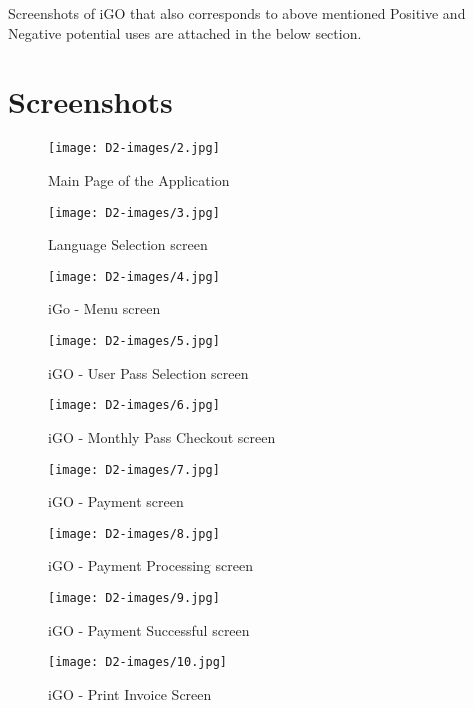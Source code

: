 \documentclass[a4paper,12pt]{report}
\newcommand{\asection}[2]{
\setcounter{section}{#1}
\addtocounter{section}{-1}
\section{#2}
}
\begin{document}
Screenshots of iGO that also corresponds to above mentioned Positive and Negative potential uses are attached in the below section.
\newpage
\asection{2}{Screenshots}
\begin{figure}[h!]
  \centering
   \texttt{[image: D2-images/2.jpg]}
  \caption{Main Page of the Application}
\end{figure}

\begin{figure}[h!]
  \centering
   \texttt{[image: D2-images/3.jpg]}
  \caption{Language Selection screen}
\end{figure}

\begin{figure}[h!]
  \centering
   \texttt{[image: D2-images/4.jpg]}
  \caption{iGo - Menu screen}
\end{figure}

\begin{figure}[h!]
  \centering
   \texttt{[image: D2-images/5.jpg]}
  \caption{iGO - User Pass Selection screen}
\end{figure}

\begin{figure}[h!]
  \centering
   \texttt{[image: D2-images/6.jpg]}
  \caption{iGO - Monthly Pass Checkout screen}
\end{figure}

\begin{figure}[h!]
  \centering
   \texttt{[image: D2-images/7.jpg]}
  \caption{iGO - Payment screen}
\end{figure}

\begin{figure}[h!]
  \centering
   \texttt{[image: D2-images/8.jpg]}
  \caption{iGO - Payment Processing screen}
\end{figure}

\begin{figure}[h!]
  \centering
   \texttt{[image: D2-images/9.jpg]}
  \caption{iGO - Payment Successful screen}
\end{figure}

\begin{figure}[h!]
  \centering
   \texttt{[image: D2-images/10.jpg]}
  \caption{iGO - Print Invoice Screen}
\end{figure}
\end{document}
